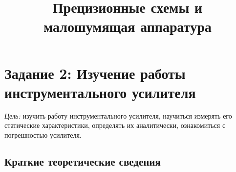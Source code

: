 \title{Прецизионные схемы и малошумящая аппаратура}
\author{}


\section{Задание 2: Изучение работы инструментального усилителя}

{\it Цель:} изучить работу инструментального усилителя, научиться измерять его статические характеристики, определять их аналитически, ознакомиться с погрешностью усилителя.
 
\subsection{Краткие теоретические сведения}


